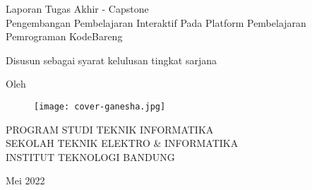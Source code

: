 \clearpage
\pagestyle{empty}

\begin{center}
    \smallskip

    \Large \bfseries \MakeUppercase{\thetitle}
    \vfill

    \Large Laporan Tugas Akhir - Capstone \\
    Pengembangan Pembelajaran Interaktif Pada Platform Pembelajaran Pemrograman KodeBareng
    \vfill

    \large Disusun sebagai syarat kelulusan tingkat sarjana
    \vfill

    \large Oleh

    \Large \theauthor

    \vfill
    \begin{figure}[h]
        \centering
        \texttt{[image: cover-ganesha.jpg]}
    \end{figure}
    \vfill

    \large
    \uppercase{
        Program Studi Teknik Informatika \\
        Sekolah Teknik Elektro \& Informatika \\
        Institut Teknologi Bandung
    }

    Mei 2022

\end{center}

\clearpage
